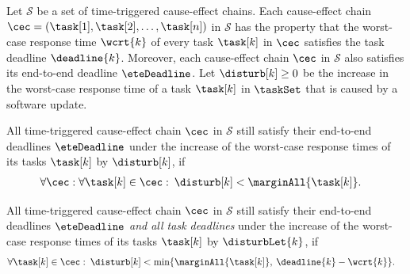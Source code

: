 \begin{tcolorbox}[colback=black!5!white,colframe=black!75!black, breakable, 
title= \textbf{Theorem} (Robustness test for time-triggered cause-effect chains)]
Let $\mathcal{S}$ be a set of time-triggered cause-effect chains. 
Each cause-effect chain $\cec = (\task[1], \task[2], \ldots, \task[n])$ in $\mathcal{S}$ has the property that the worst-case response time $\wcrt{k}$ of every task $\task[k]$ in $\cec$ satisfies the task deadline $\deadline{k}$. 
Moreover, each cause-effect chain $\cec$ in $\mathcal{S}$ also satisfies its end-to-end deadline $\eteDeadline$.
%
Let $\disturb[k] \geq 0$ be the increase in the worst-case response time of a task $\task[k]$ in $\taskSet$ that is caused by a software update.
\smallskip

All time-triggered cause-effect chain $\cec$ in $\mathcal{S}$ still satisfy their end-to-end deadlines $\eteDeadline$ under the increase of the worst-case response times of its tasks $\task[k]$ by $\disturb[k]$, if  
\begin{align*}
	& \forall \cec: \forall \task[k] \in \cec: \:
	\disturb[k] < \marginAll{\task[k]}. 
\end{align*}	

All time-triggered cause-effect chain $\cec$ in $\mathcal{S}$ still satisfy their end-to-end deadlines $\eteDeadline$ \emph{and all task deadlines} under the increase of the worst-case response times of its tasks $\task[k]$ by $\disturbLet{k}$, if  
\begin{align*}
	& \forall \task[k] \in \cec: \:
	\disturb[k] < 
	\min \{\marginAll{\task[k]}, \: \deadline{k} - \wcrt{k}\}.
\end{align*}

\end{tcolorbox}
\bigskip

